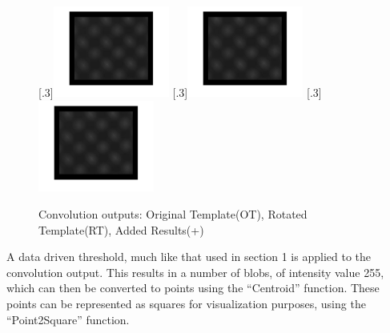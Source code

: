 \documentclass[a4paper]{article}
\begin{document}
	\begin{figure}[H]
		\centering
		[.3\linewidth]{\includegraphics[height=3cm]{Results/Q3/a/qaConv.jpg}}%
		[.3\linewidth]{\includegraphics[height=3cm]{Results/Q3/a/qaConv2.jpg}}%
		[.3\linewidth]{\includegraphics[height=3cm]{Results/Q3/a/qaAddedConv.jpg}}%
		\caption{Convolution outputs: Original Template(OT), Rotated
		Template(RT), Added Results(+)}
		\label{fig:}
	\end{figure}
	\par A data driven threshold, much like that used in section 1 is
	applied to the convolution output. This results in a number of blobs, of
	intensity value 255, which can then be converted to points using the
	``Centroid'' function. These points can be represented as squares for
	visualization purposes, using the ``Point2Square'' function.
\end{document}
